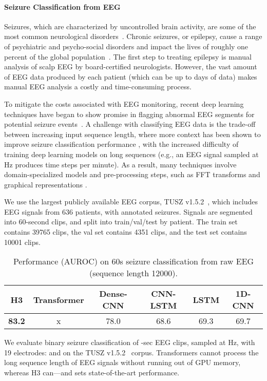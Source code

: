 \documentclass{article}
\newcommand{\hthree}{\textsc{H3}\xspace}
\begin{document}
\paragraph{Seizure Classification from EEG}
Seizures, which are characterized by uncontrolled brain activity, are some of the most common neurological disorders~\citep{fisher2014ilae}. Chronic seizures, or epilepsy, cause a range of psychiatric and psycho-social disorders and impact the lives of roughly one percent of the global population~\citep{kerr2012impact}. The first step to treating epilepsy is manual analysis of scalp EEG by board-certified neurologists. However, the vast amount of EEG data produced by each patient (which can be up to days of data) makes manual EEG analysis a costly and time-consuming process.  

To mitigate the costs associated with EEG monitoring, recent deep learning techniques have began to show promise in flagging abnormal EEG segments for potential seizure events~\citep{siddiqui2020review}. A challenge with classifying EEG data is the trade-off between increasing input sequence length, where more context has been shown to improve seizure classification performance \cite{saab2020weak}, with the increased difficulty of training deep learning models on long sequences (e.g., an EEG signal sampled at Hz produces  time steps per minute). As a result, many techniques involve domain-specialized models and pre-processing steps, such as FFT transforms and graphical representations \cite{tang2021self}.

We use the largest publicly available EEG corpus, TUSZ v1.5.2~\citep{shah2018temple}, which includes  EEG signals from 636 patients, with  annotated seizures.
Signals are segmented into 60-second clips, and split into train/val/test by patient.
The train set contains 39765 clips, the val set contains 4351 clips, and the test set contains 10001 clips.

\begin{table}[h]
\small
    \centering
\caption{\label{table:eeg} Performance (AUROC) on 60s seizure classification from raw EEG (sequence length 12000).}
{
        \begin{tabular}{@{}|cccccc|@{}}
\hline
        H3 & Transformer  & Dense-CNN & CNN-LSTM & LSTM & 1D-CNN  \\ \hline
        \textbf{83.2} & x  & 78.0 & 68.6 & 69.3 & 69.7 \\
\hline
        \end{tabular}
    }
\end{table} 
We evaluate binary seizure classification of -sec EEG clips, sampled at Hz, with 19 electrodes:  and  on the TUSZ v1.5.2~\citep{shah2018temple} corpus.
Transformers cannot process the long sequence length of EEG signals without running out of GPU memory, whereas \hthree can---and sets state-of-the-art performance.
\end{document}
